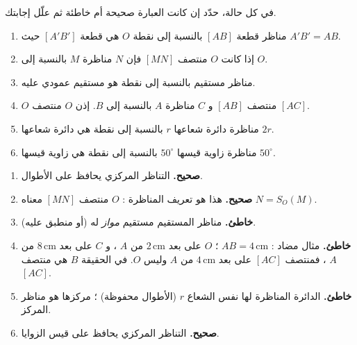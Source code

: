 \documentclass[12pt,a4paper]{article}
\newcommand{\cm}{\,\mathrm{cm}}
\begin{document}
\begin{corr}[title={صحيح أم خاطئ ؟}, stars=1, source={Axiomaths}]
في كل حالة، حدّد إن كانت العبارة صحيحة أم خاطئة ثم علّل إجابتك.
\begin{enumerate}
  \item مناظر قطعة $[AB]$ بالنسبة إلى نقطة $O$ هي قطعة $[A'B']$ حيث $A'B'=AB$.
  \item إذا كانت $O$ منتصف $[MN]$ فإن $N$ مناظرة $M$ بالنسبة إلى $O$.
  \item مناظر مستقيم بالنسبة إلى نقطة هو مستقيم عمودي عليه.
  \item $O$ منتصف $[AB]$ و $C$ مناظرة $A$ بالنسبة إلى $B$. إذن $O$ منتصف $[AC]$.
  \item مناظرة دائرة شعاعها $r$ بالنسبة إلى نقطة هي دائرة شعاعها $2r$.
  \item مناظرة زاوية قيسها $50^\circ$ بالنسبة إلى نقطة هي زاوية قيسها $50^\circ$.
\end{enumerate}
\axsol
\begin{enumerate}[itemsep=10pt]
  \item \textbf{صحيح.} التناظر المركزي يحافظ على الأطوال.
  \item \textbf{صحيح.} هذا هو تعريف المناظرة : $O$ منتصف $[MN]$ معناه $N=S_O(M)$.
  \item \textbf{خاطئ.} مناظر المستقيم مستقيم \emph{مواز} له (أو منطبق عليه).
  \item \textbf{خاطئ.} مثال مضاد : $AB=4\cm$ ؛ $O$ على بعد $2\cm$ من $A$ ، و $C$ على بعد $8\cm$ من $A$ ، فمنتصف $[AC]$ على بعد $4\cm$ من $A$ وليس $O$. في الحقيقة $B$ هي منتصف $[AC]$.
  \item \textbf{خاطئ.} الدائرة المناظرة لها نفس الشعاع $r$ (الأطوال محفوظة) ؛ مركزها هو مناظر المركز.
  \item \textbf{صحيح.} التناظر المركزي يحافظ على قيس الزوايا.
\end{enumerate}
\end{corr}
\end{document}
